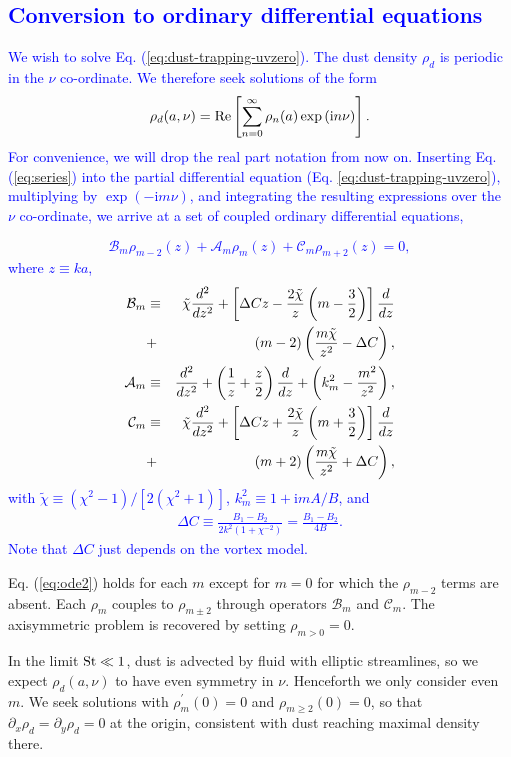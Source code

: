 \documentclass[apj]{emulateapj}
\def\blue#1{\textcolor{blue}{#1}}
\newcommand{\Eq}[1]{Eq. (\ref{#1})}
\newcommand{\eq}[1]{\Eq{#1}}
\newcommand{\eqp}[1]{(Eq. \ref{#1})}
\newcommand{\beq}{\begin{equation}}
\newcommand{\eeq}{\end{equation}}
\newcommand{\beqn}{\begin{eqnarray}}
\newcommand{\eeqn}{\end{eqnarray}}
\newcommand{\St}{{\rm St}}
\begin{document}
\blue{
\subsection{Conversion to ordinary differential equations}
We wish to solve \eq{eq:dust-trapping-uvzero}. The dust density $\rho_d$ is periodic in the $\nu$ co-ordinate. We 
therefore seek solutions of the form
\beq\label{eq:series}
\rho_d(a,\nu) = {\rm Re}
\left[\sum_{n=0}^\infty\rho_n(a)\exp{\left(\mathrm{i}n\nu\right)} \right].
\eeq
For convenience, we will drop the real part notation from now on. Inserting
\eq{eq:series} into the partial differential equation \eqp{eq:dust-trapping-uvzero},
multiplying by $\exp{(-\mathrm{i}m\nu)}$, and integrating the resulting
expressions over the $\nu$ co-ordinate, we arrive at a set of coupled
ordinary differential equations, 
}
\blue{
\beq\label{eq:ode2}
\mathcal{B}_m\rho_{m-2} (z)+ \mathcal{A}_m\rho_m(z) + \mathcal{C}_m\rho_{m+2}(z) = 0,
\eeq
}
\blue{
where $z\equiv ka$, 
\beqn
\mathcal{B}_m &\equiv& \tilde{\chi}\frac{d^2}{dz^2} + \left[\Delta C z - \frac{2\tilde{\chi}}{z}\left(m-\frac{3}{2}\right)\right]
\frac{d}{dz} \notag\\&+& \left(m-2\right)\left(\frac{m\tilde{\chi}}{z^2} -\Delta C\right),\label{eq:ops}\\
\mathcal{A}_m&\equiv&\frac{d^2}{dz^2} + \left(\frac{1}{z}+\frac{z}{2}\right)\frac{d}{dz} + \left(k_m^2-\frac{m^2}{z^2}\right),\\
\mathcal{C}_m &\equiv& \tilde{\chi}\frac{d^2}{dz^2} + \left[\Delta C z + \frac{2\tilde{\chi}}{z}\left(m+\frac{3}{2}\right)\right]
\frac{d}{dz} \notag\\&+& \left(m+2\right)\left(\frac{m\tilde{\chi}}{z^2} +\Delta C\right),\label{eq:opsw}
\eeqn
with $\tilde{\chi}\equiv(\chi^2-1)/[2(\chi^2+1)]$, $k_m^2 \equiv 1+\mathrm{i}mA/B$, and 
\begin{align}
\Delta C \equiv \frac{B_1-B_2}{2k^2(1+\chi^{-2})} = \frac{B_1 - B_2}{4B}.
\end{align}
Note that $\Delta C$ just depends on the vortex model. 
}

\eq{eq:ode2} holds for each $m$ except for $m=0$ for which the $\rho_{m-2}$ terms are absent. Each 
$\rho_m$ couples to $\rho_{m\pm2}$ through operators $\mathcal{B}_m$
and $\mathcal{C}_m$. The axisymmetric problem is recovered by
setting $\rho_{m>0}=0$. 

In the limit $\St\ll 1$, dust is advected by fluid with elliptic
streamlines, so we expect $\rho_d(a,\nu)$ to have even symmetry in
$\nu$. Henceforth we only consider even $m$. We seek solutions with  
$\rho_m^\prime(0)=0$ and $\rho_{m\geq2}(0)=0$, so that
$\partial_x\rho_d=\partial_y\rho_d=0$ at the origin, consistent with 
dust reaching maximal density there.  
%
\end{document}
